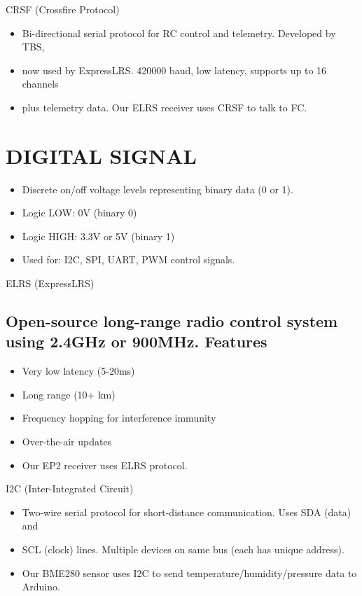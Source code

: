\documentclass[11pt,letterpaper]{article}
\begin{document}
CRSF (Crossfire Protocol)\par

\begin{itemize}
  \item Bi-directional serial protocol for RC control and telemetry. Developed by TBS,
  \item now used by ExpressLRS. 420000 baud, low latency, supports up to 16 channels
  \item plus telemetry data. Our ELRS receiver uses CRSF to talk to FC.
\end{itemize}

\section{DIGITAL SIGNAL}

\begin{itemize}
  \item Discrete on/off voltage levels representing binary data (0 or 1).
  \item Logic LOW: 0V (binary 0)
  \item Logic HIGH: 3.3V or 5V (binary 1)
  \item Used for: I2C, SPI, UART, PWM control signals.
\end{itemize}

ELRS (ExpressLRS)\par

\subsection{Open-source long-range radio control system using 2.4GHz or 900MHz. Features}

\begin{itemize}
  \item Very low latency (5-20ms)
  \item Long range (10+ km)
  \item Frequency hopping for interference immunity
  \item Over-the-air updates
  \item Our EP2 receiver uses ELRS protocol.
\end{itemize}

I2C (Inter-Integrated Circuit)\par

\begin{itemize}
  \item Two-wire serial protocol for short-distance communication. Uses SDA (data) and
  \item SCL (clock) lines. Multiple devices on same bus (each has unique address).
  \item Our BME280 sensor uses I2C to send temperature/humidity/pressure data to Arduino.
\end{itemize}
\end{document}
